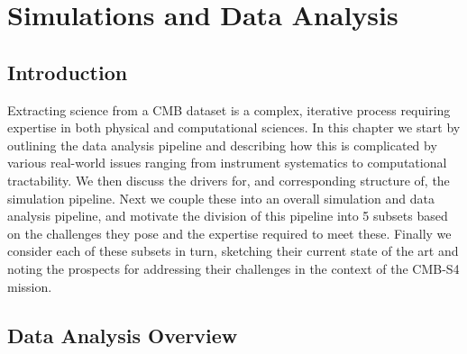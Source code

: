  
\chapter{Simulations and Data Analysis}


\section{Introduction}

Extracting science from a CMB dataset is a complex, iterative process requiring expertise in both physical and computational sciences. In this chapter we start by outlining the data analysis pipeline and describing how this is complicated by various real-world issues ranging from instrument systematics to computational tractability. We then discuss the drivers for, and corresponding structure of, the simulation pipeline. Next we couple these into an overall simulation and data analysis pipeline, and motivate the division of this pipeline into 5 subsets based on the challenges they pose and the expertise required to meet these. Finally we consider each of these subsets in turn, sketching their current state of the art and noting the prospects for addressing their challenges in the context of the CMB-S4 mission.

\section{Data Analysis Overview}


